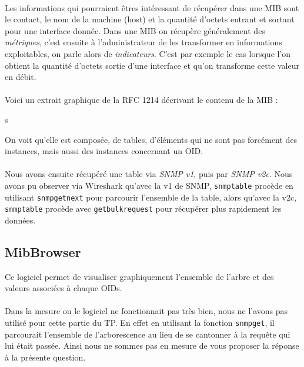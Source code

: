 \documentclass[12pt,a4paper,notitlepage]{article}
\begin{document}
\paragraph{}Les informations qui pourraient êtres intéressant de récupérer dans une MIB sont le contact, le nom de la machine (host) et la quantité d'octets entrant et sortant pour une interface donnée. Dans une MIB on récupère généralement des \textit{métriques}, c'est ensuite à l'administrateur de les transformer en informations exploitables, on parle alors de \textit{indicateurs}. C'est par exemple le cas lorsque l'on obtient la quantité d'octets sortie d'une interface et qu'on transforme cette valeur en débit.

\paragraph{}Voici un extrait graphique de la RFC 1214 décrivant le contenu de la MIB :

s

On voit qu'elle est composée, de tables, d'éléments qui ne sont pas forcément des instances, mais aussi des instances concernant un OID.

\paragraph{}Nous avons ensuite récupéré une table via \textit{SNMP v1}, puis par \textit{SNMP v2c}. Nous avons pu observer via Wireshark qu'avec la v1 de SNMP, \texttt{snmptable} procède en utilisant \texttt{snmpgetnext} pour parcourir l'ensemble de la table, alors qu'avec la v2c, \texttt{snmptable} procède avec \texttt{getbulkrequest} pour récupérer plus rapidement les données.

\subsection{MibBrowser}
Ce logiciel permet de visualiser graphiquement l'ensemble de l'arbre et des valeurs associées à chaque OIDs.

\paragraph{}Dans la mesure ou le logiciel ne fonctionnait pas très bien, nous ne l'avons pas utilisé pour cette partie du TP. En effet en utilisant la fonction \texttt{snmpget}, il parcourait l'ensemble de l'arborescence au lieu de se cantonner à la requête qui lui était passée. Ainsi nous ne sommes pas en mesure de vous proposer la réponse à la présente question.
\end{document}
